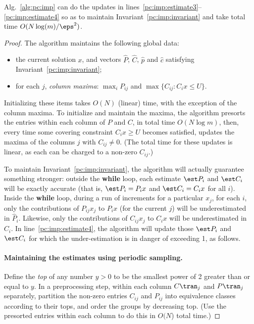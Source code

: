 \begin{lemma}\label{lemma:pc:imp:sampling}
  Alg.~\ref{alg:pc:imp} can do the updates 
  in lines~\ref{pc:imp:estimate3}--\ref{pc:imp:estimate4} 
  so as to maintain Invariant~\eqref{pc:imp:invariant}
  and take total time $O(N \log(m)/\eps^2)$.
\end{lemma}
\begin{proof}
  The algorithm maintains the following global data:
  \begin{itemize}\setlength{\itemsep}{0in}
  \item the current solution $x$, 
    and vectors $\widehat P$, $\widehat C$, $\widehat p$ and $\widehat c$ 
    satisfying Invariant~\eqref{pc:imp:invariant};
  \item for each $j$, \emph{column maxima}: 
    $\max_i P_{ij}$ and $\max \{C_{ij} : C_i x \le U\}$.
  \end{itemize}
  
  Initializing these items takes $O(N)$ (linear) time, 
  with the exception of the column maxima.
  To initialize and maintain the maxima,
  the algorithm presorts the entries within each column of $P$ and $C$, 
  in total time $O(N\log m)$,
  then, every time some covering constraint $C_i x \ge U$ becomes satisfied,
  updates the maxima of the columns $j$ with $C_{ij} \ne 0$.
  (The total time for these updates is linear, as each can be charged to a non-zero $C_{ij}$.)

  To maintain Invariant~\eqref{pc:imp:invariant},
  the algorithm will actually guarantee something stronger:
  outside the {\bf while} loop, each estimate $\est P_i$ and $\est C_i$ 
  will be exactly accurate (that is, $\est P_i = P_i x$ and $\est C_i = C_i x$ for all $i$).
  Inside the {\bf while} loop, during a run of increments for a particular $x_j$,
  for each $i$, only the contributions of $P_{ij} x_j$ to $P_i x$ (for the current $j$)
  will be underestimated in $\widehat P_i$. 
  Likewise, only the contributions of $C_{ij} x_j$ to $C_i x$
  will be underestimated in $\widehat C_i$.  
  In line~\ref{pc:imp:estimate4},
  the algorithm will update those $\est P_i$ and $\est C_i$ 
  for which the under-estimation is in danger of exceeding 1, as follows.

  \paragraph{Maintaining the estimates using periodic sampling.}
  Define the \emph{top} of any number $y> 0$ 
  to be the smallest power of 2 greater than or equal to $y$.
  In a preprocessing step,
  within each column $C\tran_j$ and $P\tran_j$ separately, 
  partition the non-zero entries $C_{ij}$ and $P_{ij}$ into equivalence classes 
  according to their tops,
  and order the groups by decreasing top.
  (Use the presorted entries within each column to do this in $O(N$) total time.)


\end{proof}
